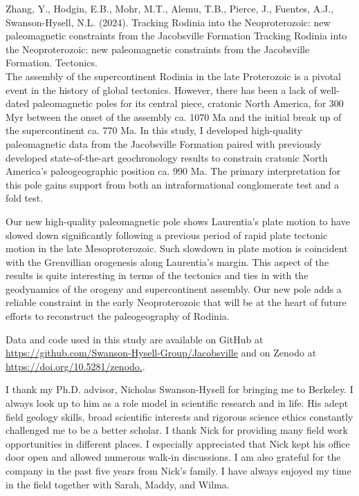 \documentclass{ucbthesis}
\begin{document}
\begin{frontmatter}

Zhang, Y., Hodgin, E.B., Mohr, M.T., Alemu, T.B., Pierce, J., Fuentes, A.J., Swanson-Hysell, N.L. (2024). Tracking Rodinia into the Neoproterozoic: new paleomagnetic constraints from the Jacobsville Formation	Tracking Rodinia into the Neoproterozoic: new paleomagnetic constraints from the Jacobsville Formation. Tectonics. 
\\

The assembly of the supercontinent Rodinia in the late Proterozoic is a pivotal event in the history of global tectonics. However, there has been a lack of well-dated paleomagnetic poles for its central piece, cratonic North America, for 300 Myr between the onset of the assembly ca. 1070 Ma and the initial break up of the supercontinent ca. 770 Ma. In this study, I developed high-quality paleomagnetic data from the Jacobsville Formation paired with previously developed state-of-the-art geochronology results to constrain cratonic North America's paleogeographic position ca. 990 Ma. The primary interpretation for this pole gains support from both an intraformational conglomerate test and a fold test. 
 
Our new high-quality paleomagnetic pole shows Laurentia's plate motion to have slowed down significantly following a previous period of rapid plate tectonic motion in the late Mesoproterozoic. Such slowdown in plate motion is coincident with the Grenvillian orogenesis along Laurentia's margin. This aspect of the results is quite interesting in terms of the tectonics and ties in with the geodynamics of the orogeny and supercontinent assembly. Our new pole adds a reliable constraint in the early Neoproterozoic that will be at the heart of future efforts to reconstruct the paleogeography of Rodinia.

Data and code used in this study are available on GitHub at \url{https://github.com/Swanson-Hysell-Group/Jacobsville} and on Zenodo at \url{https://doi.org/10.5281/zenodo.}.

\begin{acknowledgements}
I thank my Ph.D. advisor, Nicholas Swanson-Hysell for bringing me to Berkeley. I always look up to him as a role model in scientific research and in life. His adept field geology skills, broad scientific interests and rigorous science ethics constantly challenged me to be a better scholar. I thank Nick for providing many field work opportunities in different places. I especially appreciated that Nick kept his office door open and allowed numerous walk-in discussions. I am also grateful for the company in the past five years from Nick's family. I have always enjoyed my time in the field together with Sarah, Maddy, and Wilma. 


\end{acknowledgements}
\end{frontmatter}
\end{document}
